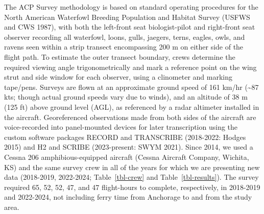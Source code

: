 \documentclass[
]{article}
\begin{document}
The ACP Survey methodology is based on standard operating procedures for
the North American Waterfowl Breeding Population and Habitat Survey
(USFWS and CWS 1987), with both the left-front seat biologist-pilot and
right-front seat observer recording all waterfowl, loons, gulls,
jaegers, terns, eagles, owls, and ravens seen within a strip transect
encompassing 200 m on either side of the flight path. To estimate the
outer transect boundary, crews determine the required viewing angle
trigonometrically and mark a reference point on the wing strut and side
window for each observer, using a clinometer and marking tape/pens.
Surveys are flown at an approximate ground speed of 161 km/hr
(\textasciitilde87 kts; though actual ground speeds vary due to winds),
and an altitude of 38 m (125 ft) above ground level (AGL), as referenced
by a radar altimeter installed in the aircraft. Georeferenced
observations made from both sides of the aircraft are voice-recorded
into panel-mounted devices for later transcription using the custom
software packages RECORD and TRANSCRIBE (2018-2022: Hodges 2015) and H2
and SCRIBE (2023-present: SWYM 2021). Since 2014, we used a Cessna 206
amphibious-equipped aircraft (Cessna Aircraft Company, Wichita, KS) and
the same survey crew in all of the years for which we are presenting new
data (2018-2019, 2022-2024; Table~\ref{tbl-crew} and
Table~\ref{tbl-results}). The survey required 65, 52, 52, 47, and 47
flight-hours to complete, respectively, in 2018-2019 and 2022-2024, not
including ferry time from Anchorage to and from the study area.

\begingroup\fontsize{10}{12}\selectfont
\end{document}
